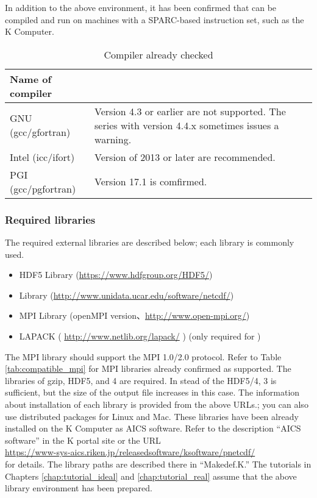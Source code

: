 In addition to the above environment, it has been confirmed that \scalelib can be compiled and run on  machines with a SPARC-based instruction set, such as the K Computer.


\begin{table}[tb]
\begin{center}
\caption{Compiler already checked}
\begin{tabularx}{150mm}{|l|X|} \hline
 \rowcolor[gray]{0.9} Name of compiler &  \\ \hline
  GNU (gcc/gfortran)    & Version 4.3 or earlier are not supported. The series with version 4.4.x sometimes issues a warning. \\ \hline
  Intel (icc/ifort)     & Version of 2013 or later are recommended. \\ \hline
  PGI (gcc/pgfortran)   & Version 17.1 is comfirmed.       \\ \hline
\end{tabularx}
\label{tab:compatible_compiler}
\end{center}
\end{table}



\subsubsection{Required libraries}\label{sec:inst_env}

The required external libraries are described below; each library is commonly used.
\begin{itemize}
\item HDF5 Library (\url{https://www.hdfgroup.org/HDF5/})
\item {\netcdf} Library (\url{http://www.unidata.ucar.edu/software/netcdf/})
\item MPI Library (openMPI version、\url{http://www.open-mpi.org/})
\item LAPACK ( \url{http://www.netlib.org/lapack/} ) (only required for \scalegm)
\end{itemize}


The MPI library should support the MPI 1.0/2.0 protocol.  Refer to Table \ref{tab:compatible_mpi} for MPI libraries already confirmed as supported.
%
The libraries of gzip, HDF5, and {\netcdf}4 are required. In stead of the HDF5/{\netcdf}4, {\netcdf}3 is sufficient, but the size of the output file increases in this case.
The information about installation of each library is provided from the above URLs.;
you can also use distributed packages for Linux and Mac. 
These libraries have been already installed on the K Computer as AICS software. Refer to the description ``AICS software'' in the K portal site or the URL\\ \url{https://www-sys-aics.riken.jp/releasedsoftware/ksoftware/pnetcdf/}\\ for details. The library paths are described there in ``Makedef.K.'' The tutorials in Chapters \ref{chap:tutorial_ideal} and \ref{chap:tutorial_real} assume that the above library environment has been prepared.



